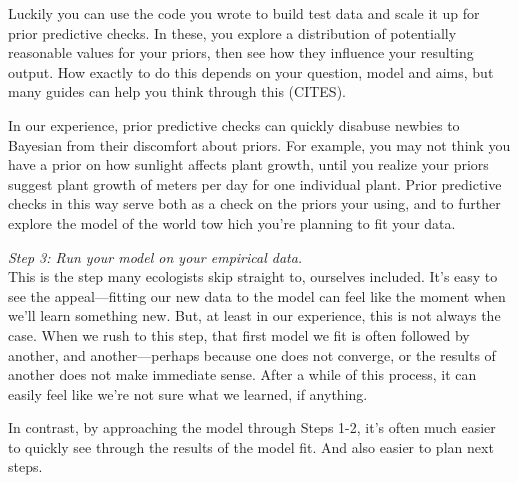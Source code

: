 \documentclass[11pt]{article}
\begin{document}
Luckily you can use the code you wrote to build test data and scale it up for prior predictive checks. In these, you explore a distribution of potentially reasonable values for your priors, then see how they influence your resulting output. How exactly to do this depends on your question, model and aims, but many guides can help you think through this (CITES). 

In our experience, prior predictive checks can quickly disabuse newbies to Bayesian from their discomfort about priors. For example, you may not think you have a prior on how sunlight affects plant growth, until you realize your priors suggest plant growth of meters per day for one individual plant. Prior predictive checks in this way serve both as a check on the priors your using, and to further explore the model of the world tow hich you're planning to fit your data. 
 
 \emph{Step 3: Run your model on your empirical data.} \\
This is the step many ecologists skip straight to, ourselves included. It's easy to see the appeal---fitting our new data to the model can feel like the moment when we'll learn something new. But, at least in our experience, this is not always the case. When we rush to this step, that first model we fit is often followed by another, and another---perhaps because one does not converge, or the results of another does not make immediate sense. After a while of this process, it can easily feel like we're not sure what we learned, if anything. 
 
 In contrast, by approaching the model through Steps 1-2, it's often much easier to quickly see through the results of the model fit. And also easier to plan next steps. 
 
\end{document}
